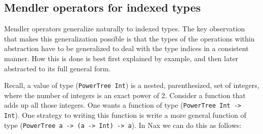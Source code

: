 \subsection{Mendler operators for indexed types}

Mendler operators generalize naturally to indexed types. The key observation
that makes this generalization possible is that the types of the operations
within abstraction have to be generalized to deal with the type indices in
a consistent manner. How this is done is best first explained by example, and
then later abstracted to its full general form.

Recall, a value of type (\verb+PowerTree Int+) is a nested, parenthesized, set
of integers, where the number of integers is an exact power of 2. Consider
a function that adds up all those integers. One wants a function of type
(\verb+PowerTree Int -> Int+). One strategy to writing this function is write
a more general function of type (\verb+PowerTree a -> (a -> Int) -> a+). In
Nax we can do this as follows:

